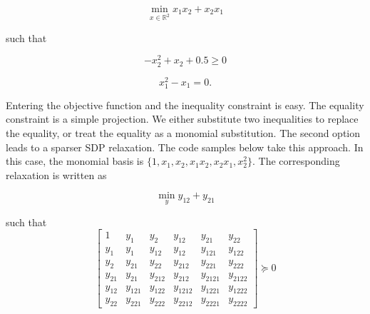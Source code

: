 \documentclass{article}
\begin{document}
\[ \min_{x\in \mathbb{R}^2}x_1x_2+x_2x_1\]

such that

\[ -x_2^2+x_2+0.5\geq 0\]

\[x_1^2-x_1=0.\]

Entering the objective function and the inequality constraint is easy. The equality constraint is a simple projection. We either substitute two inequalities to replace the equality, or treat the equality as a monomial substitution. The second option leads to a sparser SDP relaxation. The code samples below take this approach. In this case, the monomial basis is $\{1, x_1, x_2, x_1x_2, x_2x_1, x_2^2\}$. The corresponding relaxation is written as

\[ \min_{y}y_{12}+y_{21}\]

such that
\[
\left[\begin{array}{c|cc|ccc}
1 & y_{1} & y_{2} & y_{12} & y_{21} & y_{22}\\
\hline{}
y_{1} & y_{1} & y_{12} & y_{12} & y_{121} & y_{122}\\
y_{2} & y_{21} & y_{22} & y_{212} & y_{221} & y_{222}\\
\hline{}
y_{21} & y_{21} & y_{212} & y_{212} & y_{2121} & y_{2122} \\
y_{12} & y_{121} & y_{122} & y_{1212} & y_{1221} & y_{1222}\\
y_{22} & y_{221} & y_{222} & y_{2212} & y_{2221} & y_{2222}
\end{array} \right] \succeq{}0
\]
\end{document}
